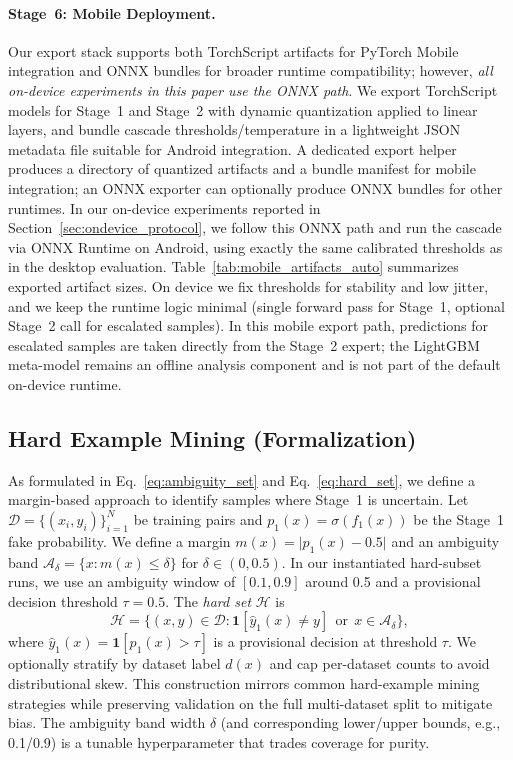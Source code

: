 \paragraph{Stage~6: Mobile Deployment.} Our export stack supports both TorchScript artifacts for PyTorch Mobile integration and ONNX bundles for broader runtime compatibility; however, \emph{all on\hyp device experiments in this paper use the ONNX path}. We export TorchScript models for Stage~1 and Stage~2 with dynamic quantization applied to linear layers, and bundle cascade thresholds/temperature in a lightweight JSON metadata file suitable for Android integration. A dedicated export helper produces a directory of quantized artifacts and a bundle manifest for mobile integration; an ONNX exporter can optionally produce ONNX bundles for other runtimes. In our on\hyp device experiments reported in Section~\ref{sec:ondevice_protocol}, we follow this ONNX path and run the cascade via ONNX Runtime on Android, using exactly the same calibrated thresholds as in the desktop evaluation. Table~\ref{tab:mobile_artifacts_auto} summarizes exported artifact sizes. On device we fix thresholds for stability and low jitter, and we keep the runtime logic minimal (single forward pass for Stage~1, optional Stage~2 call for escalated samples). In this mobile export path, predictions for escalated samples are taken directly from the Stage~2 expert; the LightGBM meta\hyp model remains an offline analysis component and is not part of the default on\hyp device runtime.

\subsection*{Hard Example Mining (Formalization)}
As formulated in Eq.~\ref{eq:ambiguity_set} and Eq.~\ref{eq:hard_set}, we define a margin\hyp based approach to identify samples where Stage~1 is uncertain. Let $\mathcal{D}=\{(x_i, y_i)\}_{i=1}^N$ be training pairs and $p_1(x)=\sigma(f_1(x))$ be the Stage~1 fake probability. We define a margin $m(x)=\lvert p_1(x)-0.5\rvert$ and an ambiguity band $\mathcal{A}_\delta=\{x: m(x)\le \delta\}$ for $\delta\in(0,0.5)$. In our instantiated hard\hyp subset runs, we use an ambiguity window of $[0.1,0.9]$ around 0.5 and a provisional decision threshold $\tau=0.5$. The \emph{hard set} $\mathcal{H}$ is
\[
\mathcal{H} = \{(x,y)\in\mathcal{D}: \mathbf{1}[\hat{y}_1(x)\ne y]\ \ \text{or}\ \ x\in\mathcal{A}_\delta\},
\]
where $\hat{y}_1(x)=\mathbf{1}[p_1(x)>\tau]$ is a provisional decision at threshold $\tau$. We optionally stratify by dataset label $d(x)$ and cap per\hyp dataset counts to avoid distributional skew. This construction mirrors common hard\hyp example mining strategies while preserving validation on the full multi\hyp dataset split to mitigate bias. The ambiguity band width $\delta$ (and corresponding lower/upper bounds, e.g., 0.1/0.9) is a tunable hyperparameter that trades coverage for purity.

